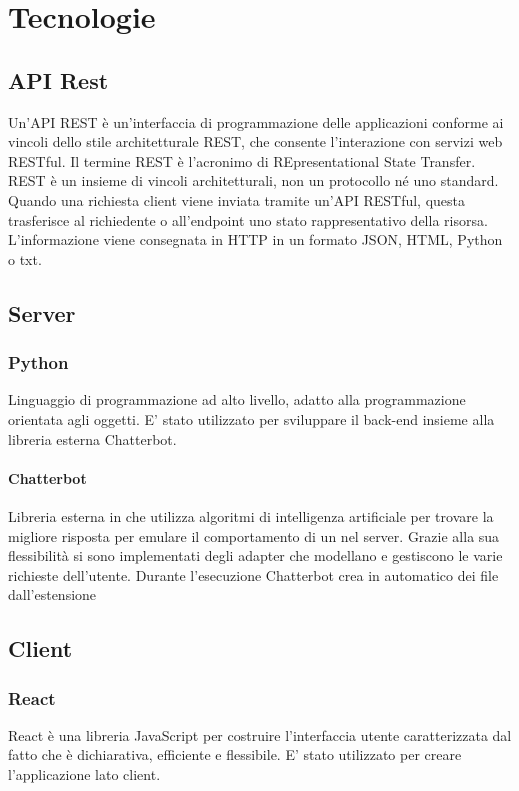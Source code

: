 \section{Tecnologie}
\subsection{API Rest}
Un'API REST è un'interfaccia di programmazione delle applicazioni conforme ai vincoli dello stile architetturale REST, che consente l'interazione con servizi web RESTful.\newline 
Il termine REST è l'acronimo di REpresentational State Transfer. REST è un insieme di vincoli architetturali, non un protocollo né uno standard.
Quando una richiesta client viene inviata tramite un'API RESTful, questa trasferisce al richiedente o all'endpoint uno stato rappresentativo della risorsa. L'informazione viene consegnata in HTTP in un formato JSON, HTML, Python o txt.

\subsection{Server}
\subsubsection{Python}
Linguaggio di programmazione ad alto livello, adatto alla programmazione orientata agli oggetti. E' stato utilizzato per sviluppare il back-end insieme alla libreria esterna Chatterbot.
\paragraph{Chatterbot}
Libreria esterna in  che utilizza algoritmi di intelligenza artificiale per trovare la migliore risposta per emulare il comportamento di un  nel server. \newline
Grazie alla sua flessibilità si sono implementati degli adapter che modellano e gestiscono le varie richieste dell'utente. \newline
Durante l'esecuzione Chatterbot crea in automatico dei file dall'estensione  

\subsection{Client}
\subsubsection{React}
React è una libreria JavaScript per costruire l'interfaccia utente caratterizzata dal fatto che è dichiarativa, efficiente e flessibile. E' stato utilizzato per creare l'applicazione lato client.
